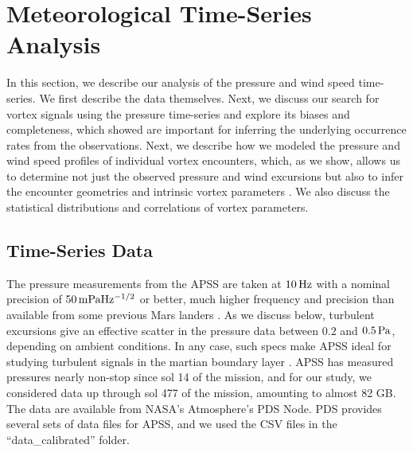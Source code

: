\documentclass[linenumbers,trackchanges]{aastex63}
\begin{document}
\section{Meteorological Time-Series Analysis}
\label{sec:Meteorological Time-Series Analysis}
In this section, we describe our analysis of the pressure and wind speed time-series. We first describe the data themselves. Next, we discuss our search for vortex signals using the pressure time-series and explore its biases and completeness, which \citet{2015JGRE..120..401J} showed are important for inferring the underlying occurrence rates from the observations. Next, we describe how we modeled the pressure and wind speed profiles of individual vortex encounters, which, as we show, allows us to determine not just the observed pressure and wind excursions but also to infer the encounter geometries and intrinsic vortex parameters \citep[\emph{cf.}][]{2016Icar..271..326L}. We also discuss the statistical distributions and correlations of vortex parameters. 

\subsection{Time-Series Data}
\label{sec:Time-Series Data}
The pressure measurements from the APSS are taken at $10\, {\rm Hz}$ with a nominal precision of $50\,{\rm mPa Hz^{-1/2}}$ or better, much higher frequency and precision than available from some previous Mars landers \citep[\emph{e.g.},][]{2010JGRE..115.0E16E}. As we discuss below, turbulent excursions give an effective scatter in the pressure data between $0.2$ and $0.5\,{\rm Pa}$, depending on ambient conditions. In any case, such specs make APSS ideal for studying turbulent signals in the martian boundary layer \citep{2018SSRv..214..109S}. APSS has measured pressures nearly non-stop since sol 14 of the mission, and for our study, we considered data up through sol 477 of the mission, amounting to almost 82 GB. The data are available from NASA's Atmosphere's PDS Node. PDS provides several sets of data files for APSS, and we used the CSV files in the ``data\_calibrated'' folder. 
\end{document}
